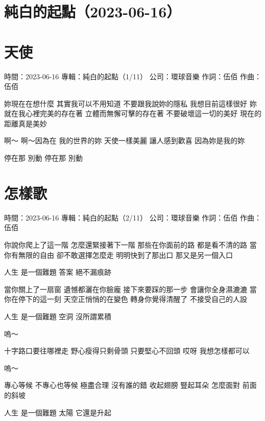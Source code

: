 \documentclass[UTF8,a4paper,oneside,twocolumn,12pt]{ctexbook}
\newcommand{\infopair}[2]{\textbullet #1：#2}
\newcommand{\zc}[1][伍佰]{\infopair{作詞}{#1}}
\newcommand{\zq}[1][伍佰]{\infopair{作曲}{#1}}
\newcommand{\zj}[1]{\infopair{專輯}{#1}}
\newcommand{\sj}[1]{\infopair{時間}{#1}}
\newcommand{\gs}[1]{\infopair{公司}{#1}}
\newenvironment{info}{\begin{flushleft}\kaishu
	}
	{\end{flushleft}\normalsize\yahei\par}
\newenvironment{lyric}{
	}
{}
\begin{document}
\section*{純白的起點（2023-06-16）}%
\section{天使}
\begin{info}
	\sj{2023-06-16}
	\zj{純白的起點（1/11）}
	\gs{環球音樂}
	\zc
	\zq
\end{info}
\begin{lyric}
	妳現在在想什麼
	其實我可以不用知道
	不要跟我說妳的隱私
	我想目前這樣很好
	妳就在我心裡完美的存在著
	立體而無懈可擊的存在著
	不要破壞這一切的美好
	現在的距離真是美妙

	啊～
	啊～因為在
	我的世界的妳
	天使一樣美麗
	讓人感到歡喜
	因為妳是我的妳

	停在那
	別動
	停在那
	別動
\end{lyric}

\section{怎樣歌}%
\begin{info}
	\sj{2023-06-16}
	\zj{純白的起點（2/11）}
	\gs{環球音樂}
	\zc
	\zq
\end{info}
\begin{lyric}
	你說你爬上了這一階 怎麼還緊接著下一階
	那些在你面前的路 都是看不清的路
	當你有無限的自由 卻不敢選擇怎麼走
	明明快到了那出口 那又是另一個入口

	人生 是一個難題
	答案 絕不漏痕跡

	當你關上了一扇窗 遺憾都灑在你臉龐
	接下來要踩的那一步 會讓你全身濕漉漉
	當你在停下的這一刻 天空正悄悄的在變色
	轉身你覺得清醒了 不接受自己的人設

	人生 是一個難題
	空洞 沒所謂累積

	嗚～

	十字路口要往哪裡走
	野心瘦得只剩骨頭
	只要堅心不回頭 哎呀
	我想怎樣都可以

	嗚～

	專心等候 不專心也等候
	極盡合理 沒有誰的錯
	收起翅膀 豎起耳朵
	怎麼面對 前面的斜坡

	人生 是一個難題
	太陽 它還是升起
\end{lyric}
\end{document}
